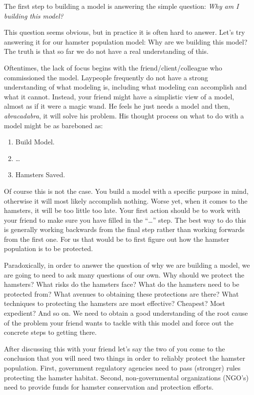 \documentclass[]{memoir}
\begin{document}
The first step to building a model is answering the simple question:
\emph{Why am I building this model?}

This question seems obvious, but in practice it is often hard to answer.
Let's try answering it for our hamster population model: Why are we
building this model? The truth is that so far we do not have a real
understanding of this.

Oftentimes, the lack of focus begins with the friend/client/colleague
who commissioned the model. Laypeople frequently do not have a strong
understanding of what modeling is, including what modeling can
accomplish and what it cannot. Instead, your friend might have a
simplistic view of a model, almost as if it were a magic wand. He feels
he just needs a model and then, \emph{abracadabra}, it will solve his
problem. His thought process on what to do with a model might be as
bareboned as:

\begin{enumerate}
\def\labelenumi{\arabic{enumi}.}
\itemsep1pt\parskip0pt
\item
  Build Model.
\item
  \ldots{}
\item
  Hamsters Saved.
\end{enumerate}

Of course this is not the case. You build a model with a specific
purpose in mind, otherwise it will most likely accomplish nothing. Worse
yet, when it comes to the hamsters, it will be too little too late. Your
first action should be to work with your friend to make sure you have
filled in the ``\ldots{}'' step. The best way to do this is generally
working backwards from the final step rather than working forwards from
the first one. For us that would be to first figure out how the hamster
population is to be protected.

Paradoxically, in order to answer the question of why we are building a
model, we are going to need to ask many questions of our own. Why should
we protect the hamsters? What risks do the hamsters face? What do the
hamsters need to be protected from? What avenues to obtaining these
protections are there? What techniques to protecting the hamsters are
most effective? Cheapest? Most expedient? And so on. We need to obtain a
good understanding of the root cause of the problem your friend wants to
tackle with this model and force out the concrete steps to getting
there.

After discussing this with your friend let's say the two of you come to
the conclusion that you will need two things in order to reliably
protect the hamster population. First, government regulatory agencies
need to pass (stronger) rules protecting the hamster habitat. Second,
non-governmental organizations (NGO's) need to provide funds for hamster
conservation and protection efforts.
\end{document}
